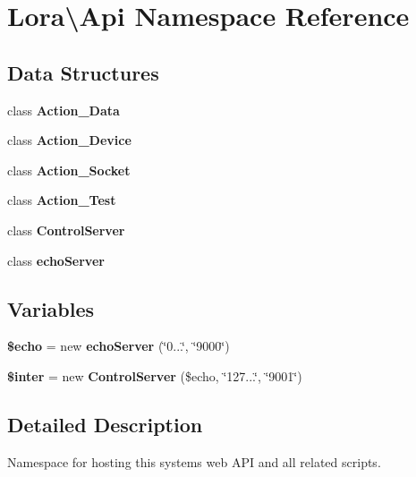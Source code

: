 \section{Lora\textbackslash{}Api Namespace Reference}
\label{namespace_lora_1_1_api}
\subsection*{Data Structures}
\begin{DoxyCompactItemize}
\item 
class \textbf{ Action\+\_\+\+Data}
\item 
class \textbf{ Action\+\_\+\+Device}
\item 
class \textbf{ Action\+\_\+\+Socket}
\item 
class \textbf{ Action\+\_\+\+Test}
\item 
class \textbf{ Control\+Server}
\item 
class \textbf{ echo\+Server}
\end{DoxyCompactItemize}
\subsection*{Variables}
\begin{DoxyCompactItemize}
\item 
\mbox{\label{namespace_lora_1_1_api_a76dbdd763137ce9b516dc94d3a16fe60}} 
{\bfseries \$echo} = new \textbf{ echo\+Server} (\char`\"{}0...\char`\"{}, \char`\"{}9000\char`\"{})
\item 
\mbox{\label{namespace_lora_1_1_api_ab515c178ff35f1107f2bc2198e4dee4b}} 
{\bfseries \$inter} = new \textbf{ Control\+Server} (\$echo, \char`\"{}127...\char`\"{}, \char`\"{}9001\char`\"{})
\end{DoxyCompactItemize}


\subsection{Detailed Description}
Namespace for hosting this systems web A\+PI and all related scripts. 